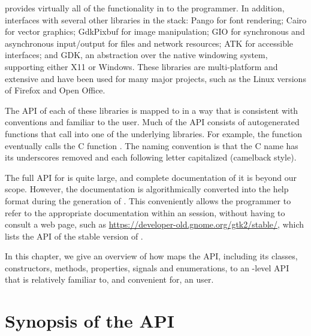 provides virtually all of the functionality in \GTK\/ to
the \R\/ programmer. In addition,  interfaces with several
other libraries in the \GTK\/ stack: Pango for font rendering; Cairo
for vector graphics; GdkPixbuf for image manipulation; GIO for
synchronous and asynchronous input/output for files and network
resources; ATK for accessible interfaces; and GDK, an abstraction over
the native windowing system, supporting either X11 or Windows. These
libraries are multi-platform and extensive and have been used for many
major projects, such as the Linux versions of Firefox and Open Office.

The API of each of these libraries is mapped to \R\/ in a way that is
consistent with \R\/ conventions and familiar to the \R\/
user. Much of the  API consists of autogenerated \R\/
functions that call into one of the underlying libraries. For
example, the \R\/ function  eventually calls
the C function . The naming convention is
that the C name has its underscores removed and each following letter
capitalized (camelback style).

The full API for \GTK\/ is quite large, and complete documentation of
it is beyond our scope. However, the \GTK\/ documentation is
algorithmically converted into the \R\/ help format during the
generation of . This conveniently allows the programmer to
refer to the appropriate documentation within an \R\/ session, without
having to consult a web page, such as
\url{https://developer-old.gnome.org/gtk2/stable/}, which lists the
 API of the stable version of \GTK.

In this chapter, we give an overview of how  maps the
\GTK\/ API, including its classes, constructors, methods, properties,
signals and enumerations, to an \R-level API that is relatively
familiar to, and convenient for, an \R\/ user. 


\section{Synopsis of the  API}

